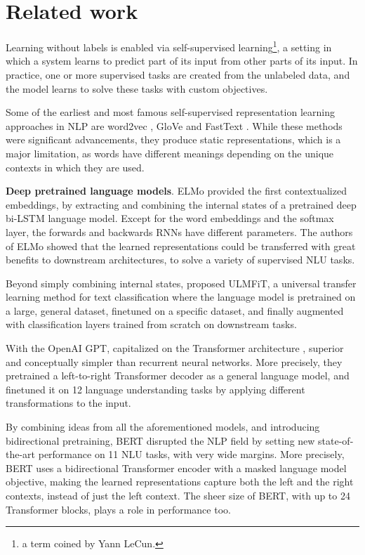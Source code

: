 \documentclass[11pt,a4paper]{article}
\begin{document}
\section{Related work}
Learning without labels is enabled via self-supervised learning\footnote{a term coined by Yann LeCun.}, a setting in which a system learns to predict part of its input from other parts of its input. In practice, one or more supervised tasks are created from the unlabeled data, and the model learns to solve these tasks with custom objectives.


Some of the earliest and most famous self-supervised representation learning approaches in NLP are word2vec
\cite{mikolov2013distributed}, GloVe \cite{pennington2014glove} and FastText \cite{bojanowski2017enriching}.
While these methods were significant advancements, they produce static representations, which is a major limitation, as words have different meanings depending on the unique contexts in which they are used.

\noindent \textbf{Deep pretrained language models}.
ELMo \cite{peters2018deep} provided the first contextualized embeddings, by extracting and combining the internal states of a pretrained deep bi-LSTM language model.
Except for the word embeddings and the softmax layer, the forwards and backwards RNNs have different parameters.
The authors of ELMo showed that the learned representations could be transferred with great benefits to downstream architectures, to solve a variety of supervised NLU tasks.

Beyond simply combining internal states, \citet{howard2018universal} proposed ULMFiT, a universal transfer learning method for text classification where the language model is pretrained on a large, general dataset, finetuned on a specific dataset, and finally augmented with classification layers trained from scratch on downstream tasks.

With the OpenAI GPT, \citet{radford2018improving} capitalized on the Transformer architecture \cite{vaswani2017attention}, superior and conceptually simpler than recurrent neural networks.
More precisely, they pretrained a left-to-right Transformer decoder as a general language model, and finetuned it on 12 language understanding tasks by applying different transformations to the input.

By combining ideas from all the aforementioned models, and introducing bidirectional pretraining, BERT \cite{devlin2018bert} disrupted the NLP field by setting new state-of-the-art performance on 11 NLU tasks, with very wide margins.
More precisely, BERT uses a bidirectional Transformer encoder with a masked language model objective, making the learned representations capture both the left and the right contexts, instead of just the left context.
The sheer size of BERT, with up to 24 Transformer blocks, plays a role in performance too.
\end{document}
